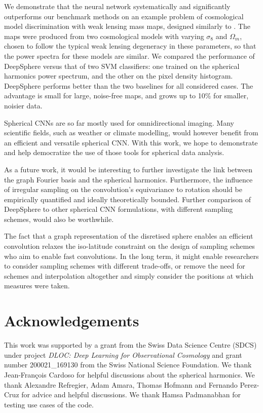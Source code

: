 \documentclass[final,twocolumn,3p,times,sort&compress]{elsarticle}
\newcommand{\1}{\b{1}}              %
\newcommand{\0}{\b{0}}              %
\begin{document}
We demonstrate that the neural network systematically and significantly outperforms our benchmark methods on an example problem of cosmological model discrimination with weak lensing mass maps, designed similarly to \citep{schmelze2017cosmologicalmodel}.
The maps were produced from two cosmological models with varying $\sigma_8$ and $\Omega_m$, chosen to follow the typical weak lensing degeneracy in these parameters, so that the power spectra for these models are similar.
We compared the performance of DeepSphere versus that of two SVM classifiers: one trained on the spherical harmonics power spectrum, and the other on the pixel density histogram.
DeepSphere performs better than the two baselines for all considered cases.
The advantage is small for large, noise-free maps, and grows up to 10\% for smaller, noisier data.

Spherical CNNs are so far mostly used for omnidirectional imaging.
Many scientific fields, such as weather or climate modelling, would however benefit from an efficient and versatile spherical CNN.
With this work, we hope to demonstrate and help democratize the use of those tools for spherical data analysis.

As a future work, it would be interesting to further investigate the link between the graph Fourier basis and the spherical harmonics.
Furthermore, the influence of irregular sampling on the convolution's equivariance to rotation should be empirically quantified and ideally theoretically bounded.
Further comparison of DeepSphere to other spherical CNN formulations, with different sampling schemes, would also be worthwhile.

The fact that a graph representation of the disretised sphere enables an efficient convolution relaxes the iso-latitude constraint on the design of sampling schemes who aim to enable fast convolutions.
In the long term, it might enable researchers to consider sampling schemes with different trade-offs, or remove the need for schemes and interpolation altogether and simply consider the positions at which measures were taken.

\section*{Acknowledgements}

This work was supported by a grant from the Swiss Data Science Centre (SDCS) under project \textit{DLOC:  Deep Learning for Observational Cosmology} and grant number 200021\_169130 from the Swiss National Science Foundation.
We thank Jean-François Cardoso for helpful discussions about the spherical harmonics.
We thank Alexandre Refregier, Adam Amara, Thomas Hofmann and Fernando Perez-Cruz for advice and helpful discussions.
We thank Hamsa Padmanabhan for testing use cases of the code.
\end{document}
